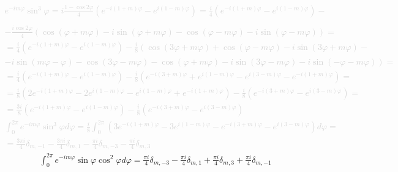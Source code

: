 \textcolor{lightgray}{ \begin{equation*} \begin{aligned}
e^{-i m \varphi} \sin^3 \varphi = 
i \frac{1 - \cos 2 \varphi}{4}
\left( e^{-i(1+m)\varphi} - e^{i(1-m)\varphi} \right) = 
\frac{i}{4} \left( e^{-i(1+m)\varphi} - e^{i(1-m)\varphi} \right) - \\
\\ - \frac{i \cos 2 \varphi}{4} \left( 
\cos (\varphi + m \varphi) - i \sin (\varphi + m \varphi) - 
\cos (\varphi - m \varphi) - i \sin (\varphi - m \varphi) \right) = \\
= \frac{i}{4} \left( e^{-i(1+m)\varphi} - e^{i(1-m)\varphi} \right) - 
\frac{i}{8} \left( \cos (3 \varphi + m \varphi) +
\cos (\varphi - m \varphi) - i \sin (3 \varphi + m \varphi) \right. - \\
- \left. i \sin (m \varphi - \varphi) - \cos (3 \varphi - m \varphi) - 
\cos (\varphi + m \varphi) - i \sin (3 \varphi - m \varphi) - 
i \sin (- \varphi - m \varphi) \right) = \\
= \frac{i}{4} \left( e^{-i(1+m)\varphi} - e^{i(1-m)\varphi} \right) - 
\frac{i}{8} \left( e^{-i (3+m) \varphi} + e^{i (1-m) \varphi}
- e^{i (3-m) \varphi} - e^{-i (1+m) \varphi} \right) = \\
= \frac{i}{8} \left( 2 e^{-i(1+m)\varphi} - 2 e^{i(1-m)\varphi} - 
e^{i(1-m)\varphi} + e^{-i(1+m)\varphi} \right) - 
\frac{i}{8} \left( e^{-i (3+m) \varphi} - e^{i (3-m) \varphi} \right) = \\
= \frac{3i}{8} \left( e^{-i(1+m)\varphi} - e^{i(1-m)\varphi} \right) - 
\frac{i}{8} \left( e^{-i (3+m) \varphi} - e^{i (3-m) \varphi} \right)
\end{aligned} \end{equation*} }
%
\textcolor{lightgray}{ \begin{equation*} \begin{aligned}
\int_{0}^{2\pi} e^{-i m \varphi} \sin^3 \varphi d \varphi = 
\frac{i}{8} \int_{0}^{2\pi} 
\left( 3 e^{-i(1+m)\varphi} - 3 e^{i(1-m)\varphi} - 
e^{-i (3+m) \varphi} - e^{i (3-m) \varphi} \right) d \varphi = \\
= \frac{3 \pi i}{4} \delta_{m,-1} - \frac{3 \pi i}{4} \delta_{m,1} - 
\frac{\pi i}{4} \delta_{m,-3} - \frac{\pi i}{4} \delta_{m,3}
\end{aligned} \end{equation*} }
%
\begin{equation} \begin{aligned}
\int_{0}^{2\pi} e^{-i m \varphi} \sin \varphi \cos^2 \varphi d \varphi = 
\frac{\pi i }{4} \delta_{m,-3} - \frac{\pi i }{4} \delta_{m,1} + 
\frac{\pi i }{4} \delta_{m,3} + \frac{\pi i }{4} \delta_{m,-1}
\end{aligned} \end{equation}
